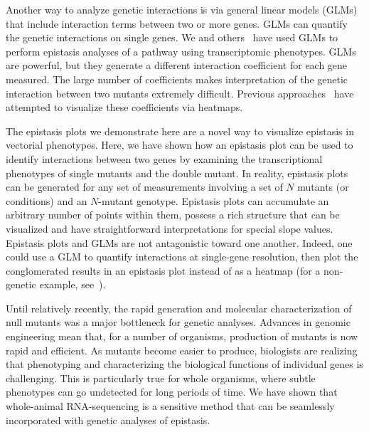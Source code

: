 \documentclass[9pt,twocolumn,twoside]{pnas-new}
\begin{document}
Another way to analyze genetic interactions is via general linear models (GLMs)
that include interaction terms between two or more genes. GLMs can quantify the
genetic interactions on single genes. We and others~\cite{Dixit2016,
Angeles-Albores2016a} have used GLMs to perform epistasis analyses of
a pathway using transcriptomic phenotypes. GLMs are powerful, but
they generate a different interaction coefficient for each gene measured. The
large number of coefficients makes interpretation of the genetic interaction
between two mutants extremely difficult. Previous approaches~\cite{Dixit2016}
have attempted to visualize these coefficients via heatmaps.

The epistasis plots we demonstrate here are a novel way to visualize epistasis
in vectorial phenotypes. Here, we have shown how an epistasis plot can be used
to identify interactions between two genes by examining the transcriptional
phenotypes of single mutants and the double mutant. In reality, epistasis plots
can be generated for any set of measurements involving a set of $N$ mutants (or
conditions) and an $N$-mutant genotype. Epistasis plots can accumulate an
arbitrary number of points within them, possess a rich structure that can be
visualized and have straightforward interpretations for special slope values.
Epistasis plots and GLMs are not antagonistic toward one another. Indeed, one
could use a GLM to quantify interactions at single-gene resolution, then plot
the conglomerated results in an epistasis plot instead of as a heatmap (for a
non-genetic example, see~\cite{Angeles-Albores2016a}).

Until relatively recently, the rapid generation and molecular characterization
of null mutants was a major bottleneck for genetic analyses. Advances in
genomic engineering mean that, for a number of organisms, production of mutants
is now rapid and efficient. As mutants become easier to produce, biologists are
realizing that phenotyping and characterizing the biological functions of
individual genes is challenging. This is particularly true for whole organisms,
where subtle phenotypes can go undetected for long periods of time. We have
shown that whole-animal RNA-sequencing is a sensitive method that can be
seamlessly incorporated with genetic analyses of epistasis.
\end{document}
